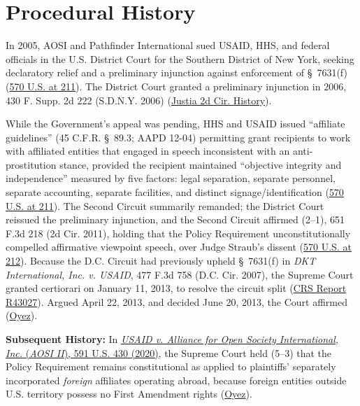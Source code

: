 \documentclass[12pt]{article}
\begin{document}
\section{Procedural History}
In 2005, AOSI and Pathfinder International sued USAID, HHS, and federal officials in the U.S. District Court for the Southern District of New York, seeking declaratory relief and a preliminary injunction against enforcement of \S~7631(f) (\href{https://supreme.justia.com/cases/federal/us/570/205/}{570 U.S. at 211}). The District Court granted a preliminary injunction in 2006, 430 F. Supp. 2d 222 (S.D.N.Y. 2006) (\href{https://law.justia.com/cases/federal/appellate-courts/ca2/15-974/15-974-2018-12-20.html}{Justia 2d Cir. History}).

While the Government's appeal was pending, HHS and USAID issued ``affiliate guidelines'' (45 C.F.R. \S~89.3; AAPD 12-04) permitting grant recipients to work with affiliated entities that engaged in speech inconsistent with an anti-prostitution stance, provided the recipient maintained ``objective integrity and independence'' measured by five factors: legal separation, separate personnel, separate accounting, separate facilities, and distinct signage/identification (\href{https://supreme.justia.com/cases/federal/us/570/205/}{570 U.S. at 211}). The Second Circuit summarily remanded; the District Court reissued the preliminary injunction, and the Second Circuit affirmed (2--1), 651 F.3d 218 (2d Cir. 2011), holding that the Policy Requirement unconstitutionally compelled affirmative viewpoint speech, over Judge Straub's dissent (\href{https://supreme.justia.com/cases/federal/us/570/205/}{570 U.S. at 212}). Because the D.C. Circuit had previously upheld \S~7631(f) in \textit{DKT International, Inc. v. USAID}, 477 F.3d 758 (D.C. Cir. 2007), the Supreme Court granted certiorari on January 11, 2013, to resolve the circuit split (\href{https://www.everycrsreport.com/reports/R43027.html}{CRS Report R43027}). Argued April 22, 2013, and decided June 20, 2013, the Court affirmed (\href{https://www.oyez.org/cases/2012/12-10}{Oyez}).

\textbf{Subsequent History:} In \href{https://supreme.justia.com/cases/federal/us/591/19-177/}{\textit{USAID v. Alliance for Open Society International, Inc.} (\textit{AOSI II}), 591 U.S. 430 (2020)}, the Supreme Court held (5--3) that the Policy Requirement remains constitutional as applied to plaintiffs' separately incorporated \emph{foreign} affiliates operating abroad, because foreign entities outside U.S. territory possess no First Amendment rights (\href{https://www.oyez.org/cases/2019/19-177}{Oyez}).
\end{document}
